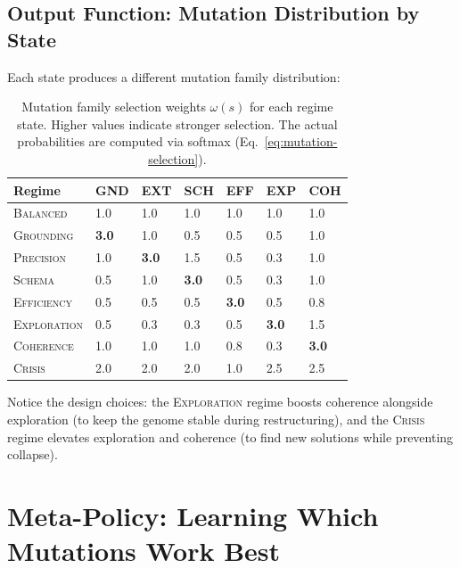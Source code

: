 \subsection{Output Function: Mutation Distribution by State}

Each state produces a different mutation family distribution:

\begin{table}[H]
\centering
\caption{Mutation family selection weights $\omega(s)$ for each regime state. Higher values indicate stronger selection. The actual probabilities are computed via softmax (Eq.~\ref{eq:mutation-selection}).}
\label{tab:regime-weights}
\begin{tabularx}{\textwidth}{L{2.2cm} Y Y Y Y Y Y}
\toprule
\textbf{Regime} & \textbf{GND} & \textbf{EXT} & \textbf{SCH} & \textbf{EFF} & \textbf{EXP} & \textbf{COH} \\
\midrule
\textsc{Balanced} & 1.0 & 1.0 & 1.0 & 1.0 & 1.0 & 1.0 \\
\textsc{Grounding} & \textbf{3.0} & 1.0 & 0.5 & 0.5 & 0.5 & 1.0 \\
\textsc{Precision} & 1.0 & \textbf{3.0} & 1.5 & 0.5 & 0.3 & 1.0 \\
\textsc{Schema} & 0.5 & 1.0 & \textbf{3.0} & 0.5 & 0.3 & 1.0 \\
\textsc{Efficiency} & 0.5 & 0.5 & 0.5 & \textbf{3.0} & 0.5 & 0.8 \\
\textsc{Exploration} & 0.5 & 0.3 & 0.3 & 0.5 & \textbf{3.0} & 1.5 \\
\textsc{Coherence} & 1.0 & 1.0 & 1.0 & 0.8 & 0.3 & \textbf{3.0} \\
\textsc{Crisis} & 2.0 & 2.0 & 2.0 & 1.0 & 2.5 & 2.5 \\
\bottomrule
\end{tabularx}
\end{table}

Notice the design choices: the \textsc{Exploration} regime boosts coherence alongside exploration (to keep the genome stable during restructuring), and the \textsc{Crisis} regime elevates exploration and coherence (to find new solutions while preventing collapse).

\section{Meta-Policy: Learning Which Mutations Work Best}
\label{sec:meta-policy}

